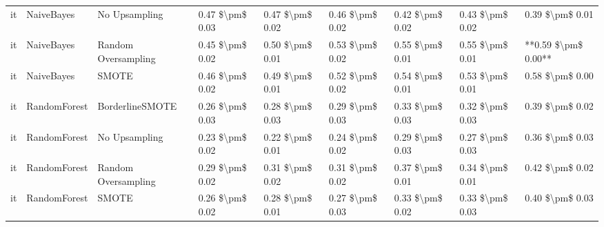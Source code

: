 \begin{tabular}{lllllllll}
      it &                      NaiveBayes &                 No Upsampling & 0.47 \$\textbackslash pm\$ 0.03 &           0.47 \$\textbackslash pm\$ 0.02 &       0.46 \$\textbackslash pm\$ 0.02 &        0.42 \$\textbackslash pm\$ 0.02 &                         0.43 \$\textbackslash pm\$ 0.02 &     0.39 \$\textbackslash pm\$ 0.01 \\
      it &                      NaiveBayes &           Random Oversampling & 0.45 \$\textbackslash pm\$ 0.02 &           0.50 \$\textbackslash pm\$ 0.01 &       0.53 \$\textbackslash pm\$ 0.02 &        0.55 \$\textbackslash pm\$ 0.01 &                         0.55 \$\textbackslash pm\$ 0.01 & **0.59 \$\textbackslash pm\$ 0.00** \\
      it &                      NaiveBayes &                         SMOTE & 0.46 \$\textbackslash pm\$ 0.02 &           0.49 \$\textbackslash pm\$ 0.01 &       0.52 \$\textbackslash pm\$ 0.02 &        0.54 \$\textbackslash pm\$ 0.01 &                         0.53 \$\textbackslash pm\$ 0.01 &     0.58 \$\textbackslash pm\$ 0.00 \\
      it &                    RandomForest &               BorderlineSMOTE & 0.26 \$\textbackslash pm\$ 0.03 &           0.28 \$\textbackslash pm\$ 0.03 &       0.29 \$\textbackslash pm\$ 0.03 &        0.33 \$\textbackslash pm\$ 0.03 &                         0.32 \$\textbackslash pm\$ 0.03 &     0.39 \$\textbackslash pm\$ 0.02 \\
      it &                    RandomForest &                 No Upsampling & 0.23 \$\textbackslash pm\$ 0.02 &           0.22 \$\textbackslash pm\$ 0.01 &       0.24 \$\textbackslash pm\$ 0.02 &        0.29 \$\textbackslash pm\$ 0.03 &                         0.27 \$\textbackslash pm\$ 0.03 &     0.36 \$\textbackslash pm\$ 0.03 \\
      it &                    RandomForest &           Random Oversampling & 0.29 \$\textbackslash pm\$ 0.02 &           0.31 \$\textbackslash pm\$ 0.02 &       0.31 \$\textbackslash pm\$ 0.02 &        0.37 \$\textbackslash pm\$ 0.01 &                         0.34 \$\textbackslash pm\$ 0.01 &     0.42 \$\textbackslash pm\$ 0.02 \\
      it &                    RandomForest &                         SMOTE & 0.26 \$\textbackslash pm\$ 0.02 &           0.28 \$\textbackslash pm\$ 0.01 &       0.27 \$\textbackslash pm\$ 0.03 &        0.33 \$\textbackslash pm\$ 0.02 &                         0.33 \$\textbackslash pm\$ 0.03 &     0.40 \$\textbackslash pm\$ 0.03 \\

\end{tabular}

